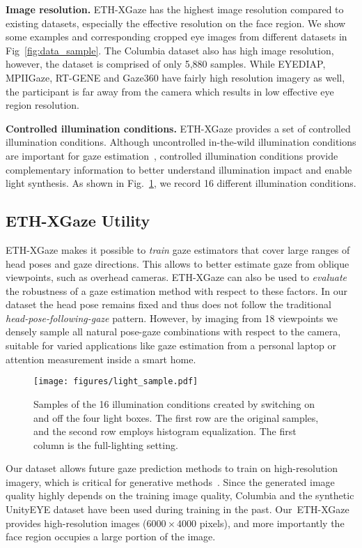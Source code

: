 \documentclass[runningheads]{llncs}
\newcommand{\datasetname}{ETH-XGaze\xspace}
\begin{document}
\textbf{Image resolution.} \datasetname has the highest image resolution compared to existing datasets, especially the effective resolution on the face region.
We show some examples and corresponding cropped eye images from different datasets in Fig~\ref{fig:data_sample}.
The Columbia dataset also has high image resolution, however, the dataset is comprised of only 5,880 samples.
While EYEDIAP, MPIIGaze, RT-GENE and Gaze360 have fairly high resolution imagery as well, the participant is far away from the camera which results in low effective eye region resolution.

\textbf{Controlled illumination conditions.} \datasetname provides a set of controlled illumination conditions.
Although uncontrolled in-the-wild illumination conditions are important for gaze estimation~\cite{zhang2019mpiigaze,krafka2016eye}, controlled illumination conditions provide complementary information to better understand illumination impact and enable light synthesis.
As shown in Fig.~\ref{fig:lighting_sample}, we record 16 different illumination conditions.

\subsection{\datasetname Utility}
\datasetname makes it possible to \emph{train} gaze estimators that cover large ranges of head poses and gaze directions. This allows to better estimate gaze from oblique viewpoints, such as overhead cameras.
\datasetname can also be used to \emph{evaluate} the robustness of a gaze estimation method with respect to these factors.
In our dataset the head pose remains fixed and thus does not follow the traditional \emph{head-pose-following-gaze} pattern. However, by imaging from 18 viewpoints we densely sample all natural pose-gaze combinations with respect to the camera, suitable for varied applications like gaze estimation from a personal laptop or attention measurement inside a smart home.

\begin{figure}[t]
    \centering
    \texttt{[image: figures/light\_sample.pdf]}
    \caption{Samples of the 16 illumination conditions created by switching on and off the four light boxes. The first row are the original samples, and the second row employs histogram equalization. The first column is the full-lighting setting.}
    \label{fig:lighting_sample}
\end{figure}

Our dataset allows future gaze prediction methods to train on high-resolution imagery, which is critical for generative methods~\cite{He_2019_ICCV,Park2019ICCV,yu2019improving,Wang_2018_CVPR}.
Since the generated image quality highly depends on the training image quality, Columbia and the synthetic UnityEYE dataset have been used during training in the past. 
Our~\datasetname provides high-resolution images ($6000\times4000$ pixels), and more importantly the face region occupies a large portion of the image.
\end{document}
